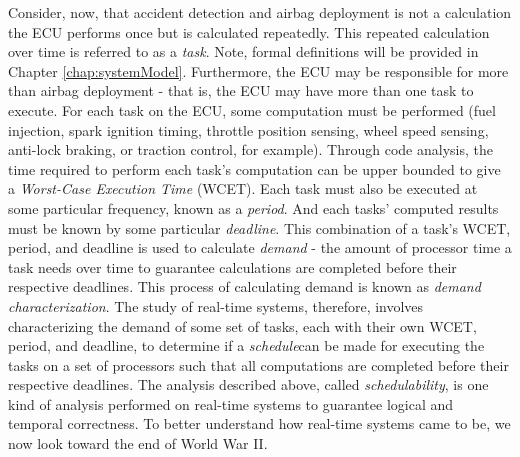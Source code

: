 Consider, now, that accident detection and airbag deployment is not a calculation the ECU performs once but is calculated repeatedly.
This repeated calculation over time is referred to as a \textit{task}.
Note, formal definitions will be provided in Chapter \ref{chap:systemModel}.
Furthermore, the ECU may be responsible for more than airbag deployment - that is, the ECU may have more than one task to execute.
For each task on the ECU, some computation must be performed (fuel injection, spark ignition timing, throttle position sensing, wheel speed sensing, anti-lock braking, or traction control, for example).
Through code analysis, the time required to perform each task's computation can be upper bounded to give a \textit{Worst-Case Execution Time} (WCET).
Each task must also be executed at some particular frequency, known as a \textit{period}.
And each tasks' computed results must be known by some particular \textit{deadline}.
This combination of a task's WCET, period, and deadline is used to calculate \textit{demand} - the amount of processor time a task needs over time to guarantee calculations are completed before their respective deadlines.
This process of calculating demand is known as \textit{demand characterization}.
The study of real-time systems, therefore, involves characterizing the demand of some set of tasks, each with their own WCET, period, and deadline, to determine if a \textit{schedule}can be made for executing the tasks on a set of processors such that all computations are completed before their respective deadlines.
The analysis described above, called \textit{schedulability}, is one kind of analysis performed on real-time systems to guarantee logical and temporal correctness.
To better understand how real-time systems came to be, we now look toward the end of World War II.



